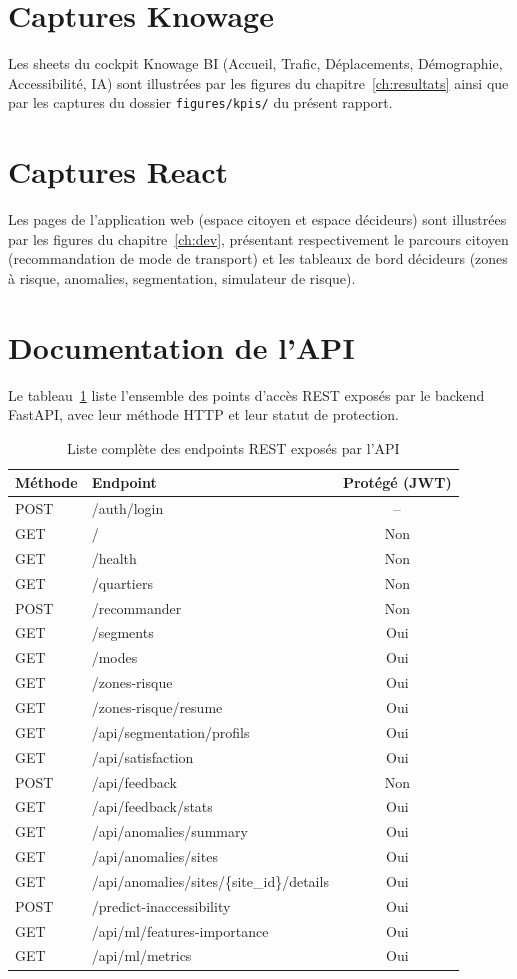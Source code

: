 \section{Captures Knowage}
Les sheets du cockpit Knowage BI (Accueil, Trafic, Déplacements, Démographie, Accessibilité, IA) sont illustrées par les figures du chapitre~\ref{ch:resultats} ainsi que par les captures du dossier \texttt{figures/kpis/} du présent rapport.

\section{Captures React}
Les pages de l'application web (espace citoyen et espace décideurs) sont illustrées par les figures du chapitre~\ref{ch:dev}, présentant respectivement le parcours citoyen (recommandation de mode de transport) et les tableaux de bord décideurs (zones à risque, anomalies, segmentation, simulateur de risque).

\section{Documentation de l'API}
Le tableau~\ref{tab:api_annexe} liste l'ensemble des points d'accès REST exposés par le backend FastAPI, avec leur méthode HTTP et leur statut de protection.

\begin{table}[H]
\centering
\caption{Liste complète des endpoints REST exposés par l'API}
\label{tab:api_annexe}
\begin{tabular}{llc}
\toprule
\textbf{Méthode} & \textbf{Endpoint} & \textbf{Protégé (JWT)} \\
\midrule
POST & /auth/login & -- \\
GET & / & Non \\
GET & /health & Non \\
GET & /quartiers & Non \\
POST & /recommander & Non \\
GET & /segments & Oui \\
GET & /modes & Oui \\
GET & /zones-risque & Oui \\
GET & /zones-risque/resume & Oui \\
GET & /api/segmentation/profils & Oui \\
GET & /api/satisfaction & Oui \\
POST & /api/feedback & Non \\
GET & /api/feedback/stats & Oui \\
GET & /api/anomalies/summary & Oui \\
GET & /api/anomalies/sites & Oui \\
GET & /api/anomalies/sites/\{site\_id\}/details & Oui \\
POST & /predict-inaccessibility & Oui \\
GET & /api/ml/features-importance & Oui \\
GET & /api/ml/metrics & Oui \\
\bottomrule
\end{tabular}
\end{table}

